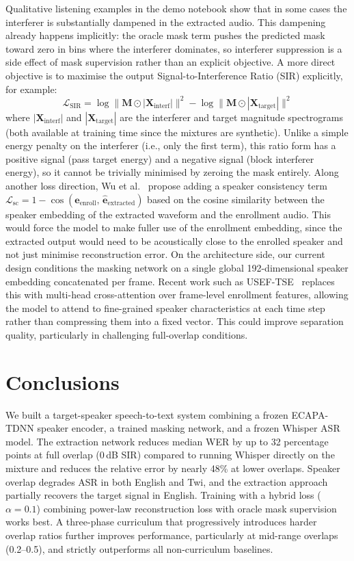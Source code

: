 \documentclass{article}
\begin{document}
Qualitative listening examples in the demo notebook show that in some cases the interferer is substantially dampened in the extracted audio. This dampening already happens implicitly: the oracle mask term pushes the predicted mask toward zero in bins where the interferer dominates, so interferer suppression is a side effect of mask supervision rather than an explicit objective. A more direct objective is to maximise the output Signal-to-Interference Ratio (SIR) explicitly, for example:
\[
    \mathcal{L}_{\text{SIR}} = \log\bigl\|\mathbf{M} \odot |\mathbf{X}_{\text{interf}}|\bigr\|^2 - \log\bigl\|\mathbf{M} \odot |\mathbf{X}_{\text{target}}|\bigr\|^2
\]
where $|\mathbf{X}_{\text{interf}}|$ and $|\mathbf{X}_{\text{target}}|$ are the interferer and target magnitude spectrograms (both available at training time since the mixtures are synthetic). Unlike a simple energy penalty on the interferer (i.e., only the first term), this ratio form has a positive signal (pass target energy) and a negative signal (block interferer energy), so it cannot be trivially minimised by zeroing the mask entirely. Along another loss direction, Wu et al.~\citep{CSC-TSE} propose adding a speaker consistency term $\mathcal{L}_{\text{sc}} = 1 - \cos(\mathbf{e}_{\text{enroll}},\, \hat{\mathbf{e}}_{\text{extracted}})$ based on the cosine similarity between the speaker embedding of the extracted waveform and the enrollment audio. This would force the model to make fuller use of the enrollment embedding, since the extracted output would need to be acoustically close to the enrolled speaker and not just minimise reconstruction error. On the architecture side, our current design conditions the masking network on a single global 192-dimensional speaker embedding concatenated per frame. Recent work such as USEF-TSE~\citep{USEF-TSE} replaces this with multi-head cross-attention over frame-level enrollment features, allowing the model to attend to fine-grained speaker characteristics at each time step rather than compressing them into a fixed vector. This could improve separation quality, particularly in challenging full-overlap conditions.

\section{Conclusions}

We built a target-speaker speech-to-text system combining a frozen ECAPA-TDNN speaker encoder, a trained masking network, and a frozen Whisper ASR model. The extraction network reduces median WER by up to 32 percentage points at full overlap (0\,dB SIR) compared to running Whisper directly on the mixture and reduces the relative error by nearly 48\% at lower overlaps. Speaker overlap degrades ASR in both English and Twi, and the extraction approach partially recovers the target signal in English. Training with a hybrid loss ($\alpha = 0.1$) combining power-law reconstruction loss with oracle mask supervision works best. A three-phase curriculum that progressively introduces harder overlap ratios further improves performance, particularly at mid-range overlaps (0.2--0.5), and strictly outperforms all non-curriculum baselines.
\end{document}
